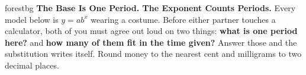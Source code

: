 \documentclass[10pt]{article}
\begin{document}
\namepartnerperiod

\vspace{0.08in}

\begin{headlinebox}{forestbg}
\small\textbf{The Base Is One Period. The Exponent Counts Periods.} Every model below is
$y=ab^{x}$ wearing a costume. Before either partner touches a calculator, both of you must agree out
loud on two things: \textbf{what is one period here?} and \textbf{how many of them fit in the time
given?} Answer those and the substitution writes itself. Round money to the nearest cent and
milligrams to two decimal places.
\end{headlinebox}

\vspace{0.06in}
\end{document}
